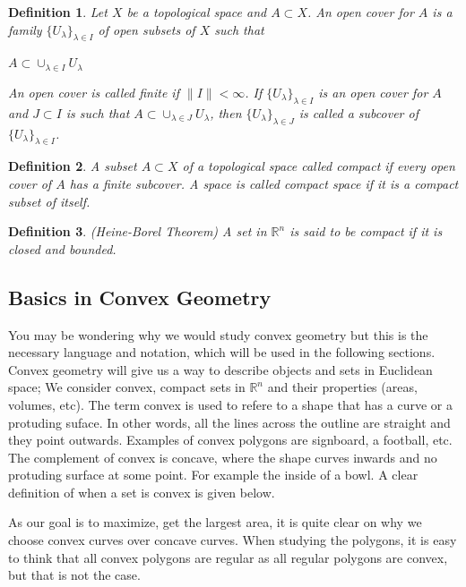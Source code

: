 \documentclass[a4paper]{book}
\newtheorem{definition}{Definition}%
\begin{document}
\begin{definition}
    Let $X$ be a topological space and $A \subset X$. An open cover for $A$ is a family $\{U_\lambda\}_{\lambda\in I}$ of open subsets of $X$ such that
    \begin{center}
        $A \subset \cup_{\lambda\in I}{U_\lambda}$
    \end{center}
    An open cover is called finite if $\|I\|<\infty$. If $\{U_\lambda\}_{\lambda\in I}$ is an open cover for $A$ and $J \subset I$ is such that $A\subset\cup_{\lambda\in J}{U_\lambda}$, then $\{U_\lambda\}_{\lambda\in J}$ is called a subcover of $\{U_\lambda\}_{\lambda\in I}$.
\end{definition}

\begin{definition}
    A subset $A \subset X$ of a topological space called compact if every open cover of $A$ has a finite subcover. A space is called compact space if it is a compact subset of itself.
\end{definition}

\begin{definition} (Heine-Borel Theorem)
    A set in $\mathbb{R}^n$ is said to be compact if it is closed and bounded.
\end{definition}

\newpage
\subsection{Basics in Convex Geometry}
You may be wondering why we would study convex geometry but this is the necessary language and notation, which will be used in the following sections. Convex geometry will give us a way to describe objects and sets in Euclidean space; We consider convex, compact sets in $\mathbb{R}^n$ and their properties (areas, volumes, etc). The term convex is used to refere to a shape that has a curve or a protuding suface. In other words, all the lines across the outline are straight and they point outwards. Examples of convex polygons are signboard, a football, etc. The complement of convex is concave, where the shape curves inwards and no protuding surface at some point. For example the inside of a bowl. A clear definition of when a set is convex is given below. 

As our goal is to maximize, get the largest area, it is quite clear on why we choose convex curves over concave curves. When studying the polygons, it is easy to think that all convex polygons are regular as all regular polygons are convex, but that is not the case.
\newline
\end{document}
